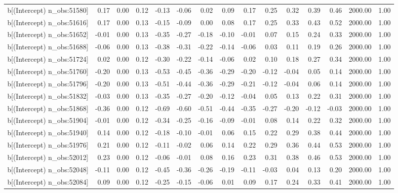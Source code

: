 \begin{table}[ht]
\begin{tabular}{rrrrrrrrrrrrrrr}
  b[(Intercept) n\_obs:51580] & 0.17 & 0.00 & 0.12 & -0.13 & -0.06 & 0.02 & 0.09 & 0.17 & 0.25 & 0.32 & 0.39 & 0.46 & 2000.00 & 1.00 \\ 
  b[(Intercept) n\_obs:51616] & 0.17 & 0.00 & 0.13 & -0.15 & -0.09 & 0.00 & 0.08 & 0.17 & 0.25 & 0.33 & 0.43 & 0.52 & 2000.00 & 1.00 \\ 
  b[(Intercept) n\_obs:51652] & -0.01 & 0.00 & 0.13 & -0.35 & -0.27 & -0.18 & -0.10 & -0.01 & 0.07 & 0.15 & 0.24 & 0.33 & 2000.00 & 1.00 \\ 
  b[(Intercept) n\_obs:51688] & -0.06 & 0.00 & 0.13 & -0.38 & -0.31 & -0.22 & -0.14 & -0.06 & 0.03 & 0.11 & 0.19 & 0.26 & 2000.00 & 1.00 \\ 
  b[(Intercept) n\_obs:51724] & 0.02 & 0.00 & 0.12 & -0.30 & -0.22 & -0.14 & -0.06 & 0.02 & 0.10 & 0.18 & 0.27 & 0.34 & 2000.00 & 1.00 \\ 
  b[(Intercept) n\_obs:51760] & -0.20 & 0.00 & 0.13 & -0.53 & -0.45 & -0.36 & -0.29 & -0.20 & -0.12 & -0.04 & 0.05 & 0.14 & 2000.00 & 1.00 \\ 
  b[(Intercept) n\_obs:51796] & -0.20 & 0.00 & 0.13 & -0.51 & -0.44 & -0.36 & -0.29 & -0.21 & -0.12 & -0.04 & 0.06 & 0.14 & 2000.00 & 1.00 \\ 
  b[(Intercept) n\_obs:51832] & -0.03 & 0.00 & 0.13 & -0.35 & -0.27 & -0.20 & -0.12 & -0.04 & 0.05 & 0.13 & 0.22 & 0.31 & 2000.00 & 1.00 \\ 
  b[(Intercept) n\_obs:51868] & -0.36 & 0.00 & 0.12 & -0.69 & -0.60 & -0.51 & -0.44 & -0.35 & -0.27 & -0.20 & -0.12 & -0.03 & 2000.00 & 1.00 \\ 
  b[(Intercept) n\_obs:51904] & -0.01 & 0.00 & 0.12 & -0.34 & -0.25 & -0.16 & -0.09 & -0.01 & 0.08 & 0.14 & 0.22 & 0.32 & 2000.00 & 1.00 \\ 
  b[(Intercept) n\_obs:51940] & 0.14 & 0.00 & 0.12 & -0.18 & -0.10 & -0.01 & 0.06 & 0.15 & 0.22 & 0.29 & 0.38 & 0.44 & 2000.00 & 1.00 \\ 
  b[(Intercept) n\_obs:51976] & 0.21 & 0.00 & 0.12 & -0.11 & -0.02 & 0.06 & 0.14 & 0.22 & 0.29 & 0.36 & 0.44 & 0.53 & 2000.00 & 1.00 \\ 
  b[(Intercept) n\_obs:52012] & 0.23 & 0.00 & 0.12 & -0.06 & -0.01 & 0.08 & 0.16 & 0.23 & 0.31 & 0.38 & 0.46 & 0.53 & 2000.00 & 1.00 \\ 
  b[(Intercept) n\_obs:52048] & -0.11 & 0.00 & 0.12 & -0.45 & -0.36 & -0.26 & -0.19 & -0.11 & -0.03 & 0.04 & 0.13 & 0.20 & 2000.00 & 1.00 \\ 
  b[(Intercept) n\_obs:52084] & 0.09 & 0.00 & 0.12 & -0.25 & -0.15 & -0.06 & 0.01 & 0.09 & 0.17 & 0.24 & 0.33 & 0.41 & 2000.00 & 1.00 \\ 

\end{tabular}
\end{table}
